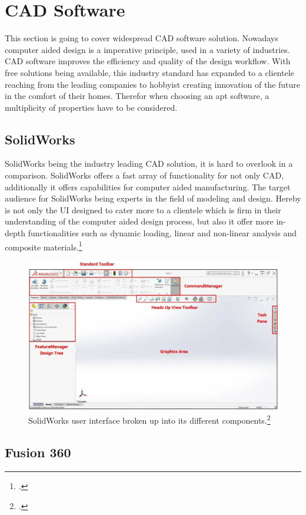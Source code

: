 \section{CAD Software}

This section is going to cover widespread CAD software solution. Nowadays computer aided design is a imperative principle, used in a variety of industries. CAD software improves the efficiency and quality of the design workflow. With free solutions being available, this industry standard has expanded to a clientele reaching from the leading companies to hobbyist creating innovation of the future in the comfort of their homes. Therefor when choosing an apt software, a multiplicity of properties have to be considered.

\subsection{SolidWorks}

SolidWorks being the industry leading CAD solution, it is hard to overlook in a comparison. SolidWorks offers a fast array of functionality for not only CAD, additionally it offers capabilities for computer aided manufacturing. 
The target audience for SolidWorks being experts in the field of modeling and design. Hereby is not only the UI designed to cater more to a clientele which is firm in their understanding of the computer aided design process, but also it offer more in-depth functionalities such as dynamic loading, linear and non-linear analysis and composite materials.\footcite{all3dpSolidWorksVsFusion2021}

\begin{figure}[h]
	\centering
	\includegraphics[width=0.6\linewidth]{img/SolidWorksUI}
	\caption{SolidWorks user interface broken up into its different components.\footcite{hawkridgesysUIBSolidWorks2019}}
	\label{fig:custom_parts_solidworks}
\end{figure}


\subsection{Fusion 360}

